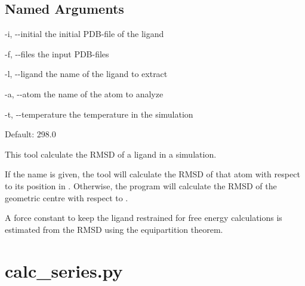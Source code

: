 \documentclass[letterpaper,10pt,english]{sphinxmanual}
\begin{document}
\subsection{Named Arguments}
\label{\detokenize{tools:Named Arguments}}\begin{optionlist}{3cm}
\item [-i, -{-}initial]  
the initial PDB-file of the ligand
\item [-f, -{-}files]  
the input PDB-files
\item [-l, -{-}ligand]  
the name of the ligand to extract
\item [-a, -{-}atom]  
the name of the atom to analyze
\item [-t, -{-}temperature]  
the temperature in the simulation

Default: 298.0
\end{optionlist}


%
\begin{sphinxVerbatim}[commandchars=\\\{\}]
      
        
\end{sphinxVerbatim}


This tool calculate the RMSD of a ligand in a simulation.

If the  name is given, the tool will calculate the RMSD of that atom with respect to its position in . Otherwise, the program will calculate the RMSD of the geometric centre with respect to .

A force constant to keep the ligand restrained for free energy calculations is estimated from the RMSD using the equipartition theorem.


\section{calc\_series.py}
\label{\detokenize{tools:calc-series-py}}
\end{document}
